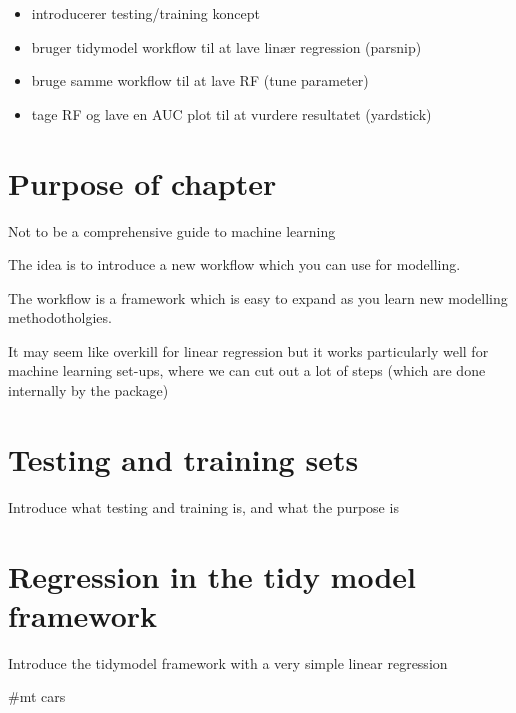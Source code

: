\documentclass[
]{book}
\providecommand{\tightlist}{%
  \setlength{\itemsep}{0pt}\setlength{\parskip}{0pt}}
\begin{document}
\begin{itemize}
\tightlist
\item
  introducerer testing/training koncept
\item
  bruger tidymodel workflow til at lave linær regression (parsnip)
\item
  bruge samme workflow til at lave RF (tune parameter)
\item
  tage RF og lave en AUC plot til at vurdere resultatet (yardstick)
\end{itemize}

\hypertarget{purpose-of-chapter}{%
\section{Purpose of chapter}\label{purpose-of-chapter}}

Not to be a comprehensive guide to machine learning

The idea is to introduce a new workflow which you can use for modelling.

The workflow is a framework which is easy to expand as you learn new modelling methodotholgies.

It may seem like overkill for linear regression but it works particularly well for machine learning set-ups, where we can cut out a lot of steps (which are done internally by the package)

\hypertarget{testing-and-training-sets}{%
\section{Testing and training sets}\label{testing-and-training-sets}}

Introduce what testing and training is, and what the purpose is

\hypertarget{regression-in-the-tidy-model-framework}{%
\section{Regression in the tidy model framework}\label{regression-in-the-tidy-model-framework}}

Introduce the tidymodel framework with a very simple linear regression

\#mt cars
\end{document}

